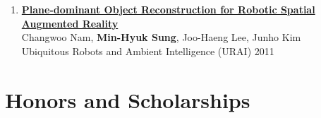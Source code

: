 \documentclass[letterpaper,10pt]{article} %
\newcommand{\blankline}{\quad\pagebreak[2]}
\begin{document}
{{\begin{enumerate}
\item \label{urai11}
\href{http://dx.doi.org/10.1109/URAI.2011.6145896}{\textbf{Plane-dominant Object Reconstruction for Robotic Spatial Augmented Reality}} \\
Changwoo Nam, \textbf{Min-Hyuk Sung}, Joo-Haeng Lee, Junho Kim \\
Ubiquitous Robots and Ambient Intelligence (URAI) 2011 \\
\blankline

%

\end{enumerate}

\blankline



\section{Honors and Scholarships}

}}
\end{document}
